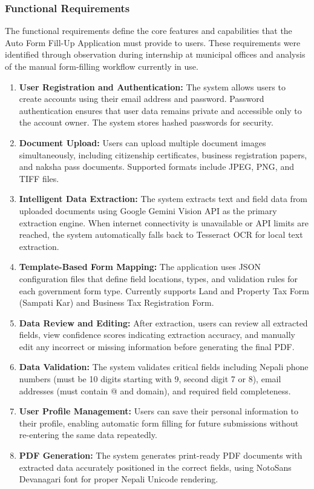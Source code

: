 \documentclass[12pt]{report}
\begin{document}
\subsubsection{Functional Requirements}
The functional requirements define the core features and capabilities that the Auto Form Fill-Up Application must provide to users. These requirements were identified through observation during internship at municipal offices and analysis of the manual form-filling workflow currently in use.
\begin{enumerate}[label=\textbullet, leftmargin=*, nosep, itemsep=2pt, topsep=2pt]
\item\textbf{User Registration and Authentication:} The system allows users to create accounts   using their email address and password. Password authentication ensures that user data remains private and accessible only to the account owner. The system stores hashed passwords for security.

\item\textbf{Document Upload:} Users can upload multiple document images simultaneously, including citizenship certificates, business registration papers, and naksha pass documents. Supported formats include JPEG, PNG, and TIFF files.

\item\textbf{Intelligent Data Extraction:} The system extracts text and field data from uploaded documents using Google Gemini Vision API as the primary extraction engine. When internet connectivity is unavailable or API limits are reached, the system automatically falls back to Tesseract OCR for local text extraction.

\item\textbf{Template-Based Form Mapping:} The application uses JSON configuration files that define field locations, types, and validation rules for each government form type. Currently supports Land and Property Tax Form (Sampati Kar) and Business Tax Registration Form.

\item\textbf{Data Review and Editing:} After extraction, users can review all extracted fields, view confidence scores indicating extraction accuracy, and manually edit any incorrect or missing information before generating the final PDF.

\item\textbf{Data Validation:} The system validates critical fields including Nepali phone numbers (must be 10 digits starting with 9, second digit 7 or 8), email addresses (must contain @ and domain), and required field completeness.

\item\textbf{User Profile Management:} Users can save their personal information to their profile, enabling automatic form filling for future submissions without re-entering the same data repeatedly.

\item\textbf{PDF Generation:} The system generates print-ready PDF documents with extracted data accurately positioned in the correct fields, using NotoSans Devanagari font for proper Nepali Unicode rendering.
\end{enumerate}
\end{document}
